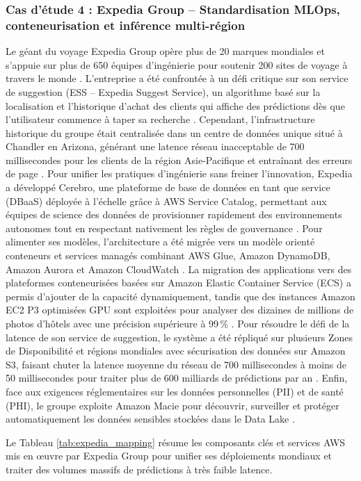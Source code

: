 \subsubsection{Cas d'étude 4 : Expedia Group -- Standardisation MLOps, conteneurisation et inférence multi-région}
Le géant du voyage Expedia Group opère plus de 20 marques mondiales et s'appuie sur plus de 650 équipes d'ingénierie pour soutenir 200 sites de voyage à travers le monde \cite{81}. L'entreprise a été confrontée à un défi critique sur son service de suggestion (ESS -- Expedia Suggest Service), un algorithme basé sur la localisation et l'historique d'achat des clients qui affiche des prédictions dès que l'utilisateur commence à taper sa recherche \cite{78}. Cependant, l'infrastructure historique du groupe était centralisée dans un centre de données unique situé à Chandler en Arizona, générant une latence réseau inacceptable de 700 millisecondes pour les clients de la région Asie-Pacifique et entraînant des erreurs de page \cite{78}. Pour unifier les pratiques d'ingénierie sans freiner l'innovation, Expedia a développé Cerebro, une plateforme de base de données en tant que service (DBaaS) déployée à l'échelle grâce à AWS Service Catalog, permettant aux équipes de science des données de provisionner rapidement des environnements autonomes tout en respectant nativement les règles de gouvernance \cite{78, 81}. Pour alimenter ses modèles, l'architecture a été migrée vers un modèle orienté conteneurs et services managés combinant AWS Glue, Amazon DynamoDB, Amazon Aurora et Amazon CloudWatch \cite{81}. La migration des applications vers des plateformes conteneurisées basées sur Amazon Elastic Container Service (ECS) a permis d'ajouter de la capacité dynamiquement, tandis que des instances Amazon EC2 P3 optimisées GPU sont exploitées pour analyser des dizaines de millions de photos d'hôtels avec une précision supérieure à 99\,\% \cite{78, 81}. Pour résoudre le défi de la latence de son service de suggestion, le système a été répliqué sur plusieurs Zones de Disponibilité et régions mondiales avec sécurisation des données sur Amazon S3, faisant chuter la latence moyenne du réseau de 700 millisecondes à moins de 50 millisecondes pour traiter plus de 600 milliards de prédictions par an \cite{78, 81}. Enfin, face aux exigences réglementaires sur les données personnelles (PII) et de santé (PHI), le groupe exploite Amazon Macie pour découvrir, surveiller et protéger automatiquement les données sensibles stockées dans le Data Lake \cite{81}.

Le Tableau \ref{tab:expedia_mapping} résume les composants clés et services AWS mis en œuvre par Expedia Group pour unifier ses déploiements mondiaux et traiter des volumes massifs de prédictions à très faible latence.

